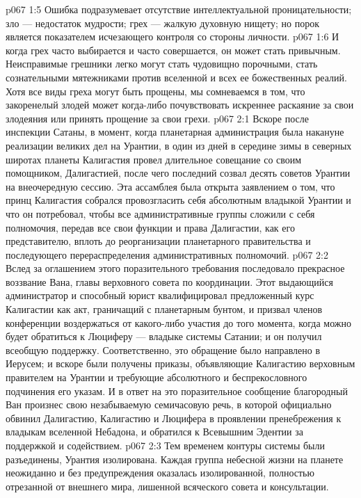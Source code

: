 \vs p067 1:5 Ошибка подразумевает отсутствие интеллектуальной проницательности; зло --- недостаток мудрости; грех --- жалкую духовную нищету; но порок является показателем исчезающего контроля со стороны личности.
\vs p067 1:6 И когда грех часто выбирается и часто совершается, он может стать привычным. Неисправимые грешники легко могут стать чудовищно порочными, стать сознательными мятежниками против вселенной и всех ее божественных реалий. Хотя все виды греха могут быть прощены, мы сомневаемся в том, что закоренелый злодей может когда\hyp{}либо почувствовать искреннее раскаяние за свои злодеяния или принять прощение за свои грехи.
\vs p067 2:1 Вскоре после инспекции Сатаны, в момент, когда планетарная администрация была накануне реализации великих дел на Урантии, в один из дней в середине зимы в северных широтах планеты Калигастия провел длительное совещание со своим помощником, Далигастией, после чего последний созвал десять советов Урантии на внеочередную сессию. Эта ассамблея была открыта заявлением о том, что принц Калигастия собрался провозгласить себя абсолютным владыкой Урантии и что он потребовал, чтобы все административные группы сложили с себя полномочия, передав все свои функции и права Далигастии, как его представителю, вплоть до реорганизации планетарного правительства и последующего перераспределения административных полномочий.
\vs p067 2:2 Вслед за оглашением этого поразительного требования последовало прекрасное воззвание Вана, главы верховного совета по координации. Этот выдающийся администратор и способный юрист квалифицировал предложенный курс Калигастии как акт, граничащий с планетарным бунтом, и призвал членов конференции воздержаться от какого\hyp{}либо участия до того момента, когда можно будет обратиться к Люциферу --- владыке системы Сатании; и он получил всеобщую поддержку. Соответственно, это обращение было направлено в Иерусем; и вскоре были получены приказы, объявляющие Калигастию верховным правителем на Урантии и требующие абсолютного и беспрекословного подчинения его указам. И в ответ на это поразительное сообщение благородный Ван произнес свою незабываемую семичасовую речь, в которой официально обвинил Далигастию, Калигастию и Люцифера в проявлении пренебрежения к владыкам вселенной Небадона, и обратился к Всевышним Эдентии за поддержкой и содействием.
\vs p067 2:3 \pc Тем временем контуры системы были разъединены, Урантия изолирована. Каждая группа небесной жизни на планете неожиданно и без предупреждения оказалась изолированной, полностью отрезанной от внешнего мира, лишенной всяческого совета и консультации.
